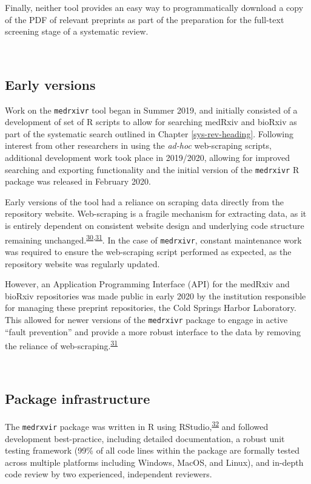 \documentclass[a4paper, twoside]{templates/ociamthesis}
\begin{document}
Finally, neither tool provides an easy way to programmatically download a copy of the PDF of relevant preprints as part of the preparation for the full-text screening stage of a systematic review.

~

\hypertarget{early-versions}{%
\subsection{Early versions}\label{early-versions}}

Work on the \texttt{medrxivr} tool began in Summer 2019, and initially consisted of a development of set of R scripts to allow for searching medRxiv and bioRxiv as part of the systematic search outlined in Chapter \ref{sys-rev-heading}. Following interest from other researchers in using the \emph{ad-hoc} web-scraping scripts, additional development work took place in 2019/2020, allowing for improved searching and exporting functionality and the initial version of the \texttt{medrxivr} R package was released in February 2020.

Early versions of the tool had a reliance on scraping data directly from the repository website. Web-scraping is a fragile mechanism for extracting data, as it is entirely dependent on consistent website design and underlying code structure remaining unchanged.\textsuperscript{\protect\hyperlink{ref-shaw2002}{30},\protect\hyperlink{ref-laprie1992}{31}}. In the case of \texttt{medrxivr}, constant maintenance work was required to ensure the web-scraping script performed as expected, as the repository website was regularly updated.

However, an Application Programming Interface (API) for the medRxiv and bioRxiv repositories was made public in early 2020 by the institution responsible for managing these preprint repositories, the Cold Springs Harbor Laboratory. This allowed for newer versions of the \texttt{medrxivr} package to engage in active ``fault prevention'' and provide a more robust interface to the data by removing the reliance of web-scraping.\textsuperscript{\protect\hyperlink{ref-laprie1992}{31}}

~

\hypertarget{package-infrastructure}{%
\subsection{Package infrastructure}\label{package-infrastructure}}

The \texttt{medrxvir} package was written in R using RStudio,\textsuperscript{\protect\hyperlink{ref-rcoreteam2019}{32}} and followed development best-practice, including detailed documentation, a robust unit testing framework (99\% of all code lines within the package are formally tested across multiple platforms including Windows, MacOS, and Linux), and in-depth code review by two experienced, independent reviewers.
\end{document}

